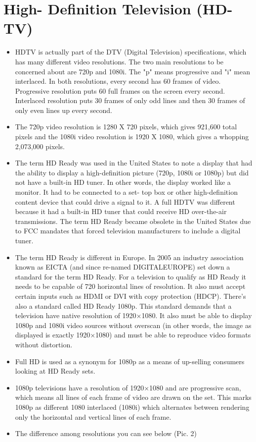 \documentclass[english]{article}
\begin{document}
\section{High- Definition Television (HD- TV)}
\begin{itemize}
\item HDTV is actually part of the DTV (Digital Television) specifications, which has many different video resolutions. The two main resolutions to be concerned about are 720p and 1080i. The "p" means progressive and "i" mean interlaced. In both resolutions, every second has 60 frames of video. Progressive resolution puts 60 full frames on the screen every second. Interlaced resolution puts 30 frames of only odd lines and then 30 frames of only even lines up every second.
\item The 720p video resolution is 1280 X 720 pixels, which gives 921,600 total pixels and the 1080i video resolution is 1920 X 1080, which gives a whopping 2,073,000 pixels.
\item The term HD Ready was used in the United States to note a display that had the ability to display a high-definition picture (720p, 1080i or 1080p) but did not have a built-in HD tuner. In other words, the display worked like a monitor. It had to be connected to a set- top box or other high-definition content device that could drive a signal to it. A full HDTV was different because it had a built-in HD tuner that could receive HD over-the-air transmissions. The term HD Ready became obsolete in the United States due to FCC mandates that forced television manufacturers to include a digital tuner.
\item The term HD Ready is different in Europe. In 2005 an industry association known as EICTA (and since re-named DIGITALEUROPE) set down a standard for the term HD Ready. For a television to qualify as HD Ready it needs to be capable of 720 horizontal lines of resolution. It also must accept certain inputs such as HDMI or DVI with copy protection (HDCP). There’s also a standard called HD Ready 1080p. This standard demands that a television have native resolution of 1920×1080. It also must be able to display 1080p and 1080i video sources without overscan (in other words, the image as displayed is exactly 1920×1080) and must be able to reproduce video formats without distortion.
\item Full HD is used as a synonym for 1080p as a means of up-selling consumers looking at HD Ready sets.
\item 1080p televisions have a resolution of 1920×1080 and are progressive scan, which means all lines of each frame of video are drawn on the set. This marks 1080p as different 1080 interlaced (1080i) which alternates between rendering only the horizontal and vertical lines of each frame.
\item The difference among resolutions you can see below (Pic. 2)
\end{itemize}
\end{document}
